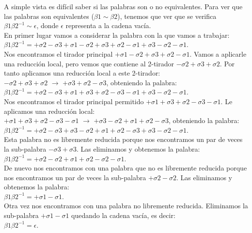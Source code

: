 \documentclass[14pt]{extarticle}
\begin{document}
A simple vista es difícil saber si las palabras son o no equivalentes. Para ver que las palabras son equivalentes ($\beta1 \sim \beta2$), tenemos que ver que se verifica $\beta1 \beta2^{-1} \sim \epsilon$, donde $\epsilon$ representa a la cadena vacía.\\

En primer lugar vamos a considerar la palabra con la que vamos a trabajar:\\
$\beta1 \beta2^{-1} =+\sigma2-\sigma3+\sigma1-\sigma2+\sigma3+\sigma2-\sigma1+\sigma3-\sigma2-\sigma1$.\\

Nos encontramos el tirador principal $ +\sigma1-\sigma2+\sigma3+\sigma2-\sigma1 $. Vamos a aplicarle una reducción local, pero vemos que contiene al 2-tirador $-\sigma2+\sigma3+\sigma2$. Por tanto aplicamos una reducción local a este 2-tirador:\\
$-\sigma2+\sigma3+\sigma2$ $\rightarrow$ $+\sigma3+\sigma2-\sigma3$, obteniendo la palabra:\\
$\beta1 \beta2^{-1} =+\sigma2-\sigma3+\sigma1+\sigma3+\sigma2-\sigma3-\sigma1+\sigma3-\sigma2-\sigma1$.\\

Nos encontramos el tirador principal permitido $+\sigma1+\sigma3+\sigma2-\sigma3-\sigma1$. Le aplicamos una reducción local:\\ 
$+\sigma1+\sigma3+\sigma2-\sigma3-\sigma1$ $\rightarrow$ $+\sigma3-\sigma2+\sigma1+\sigma2-\sigma3$, obteniendo la palabra:\\
$\beta1 \beta2^{-1} =+\sigma2-\sigma3+\sigma3-\sigma2+\sigma1+\sigma2-\sigma3+\sigma3-\sigma2-\sigma1$.\\

Esta palabra no es libremente reducida porque nos encontramos un par de veces la sub-palabra $ -\sigma3+\sigma3 $. Las eliminamos y obtenemos la palabra:\\
$\beta1 \beta2^{-1} =+\sigma2-\sigma2+\sigma1+\sigma2-\sigma2-\sigma1$.\\

De nuevo nos encontramos con una palabra que no es libremente reducida porque nos encontramos un par de veces la sub-palabra $ +\sigma2-\sigma2 $. Las eliminamos y obtenemos la palabra:\\
$\beta1 \beta2^{-1} =+\sigma1-\sigma1$.\\

Otra vez nos encontramos con una palabra no libremente reducida. Eliminamos la sub-palabra $+\sigma1-\sigma1$ quedando la cadena vacía, es decir:\\
$\beta1 \beta2^{-1} =\epsilon$.\\
\end{document}
